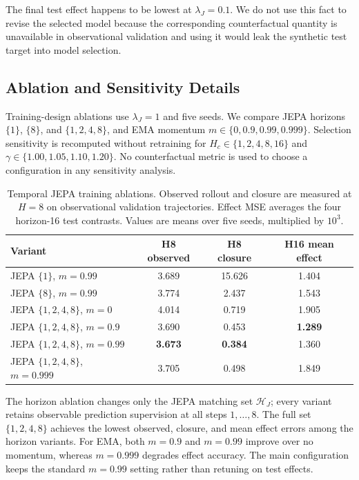 The final test effect happens to be lowest at $\lambda_J=0.1$. We do not
use this fact to revise the selected model because the corresponding
counterfactual quantity is unavailable in observational validation and
using it would leak the synthetic test target into model selection.

\subsection{Ablation and Sensitivity Details}
\label{app:ablation-details}

Training-design ablations use $\lambda_J=1$ and five seeds. We compare
JEPA horizons $\{1\}$, $\{8\}$, and $\{1,2,4,8\}$, and EMA momentum
$m\in\{0,0.9,0.99,0.999\}$. Selection sensitivity is recomputed without
retraining for $H_c\in\{1,2,4,8,16\}$ and
$\gamma\in\{1.00,1.05,1.10,1.20\}$. No counterfactual metric is used to
choose a configuration in any sensitivity analysis.

\begin{table}[t]
\centering
\caption{Temporal JEPA training ablations. Observed rollout and closure
are measured at $H=8$ on observational validation trajectories. Effect
MSE averages the four horizon-16 test contrasts. Values are means over
five seeds, multiplied by $10^3$.}
\label{tab:app-jepa-ablation}
\begin{tabular}{lccc}
\toprule
Variant & H8 observed & H8 closure & H16 mean effect \\
\midrule
JEPA $\{1\}$, $m=0.99$ & 3.689 & 15.626 & 1.404 \\
JEPA $\{8\}$, $m=0.99$ & 3.774 & 2.437 & 1.543 \\
JEPA $\{1,2,4,8\}$, $m=0$ & 4.014 & 0.719 & 1.905 \\
JEPA $\{1,2,4,8\}$, $m=0.9$ & 3.690 & 0.453 & \textbf{1.289} \\
JEPA $\{1,2,4,8\}$, $m=0.99$ & \textbf{3.673} & \textbf{0.384} & 1.360 \\
JEPA $\{1,2,4,8\}$, $m=0.999$ & 3.705 & 0.498 & 1.849 \\
\bottomrule
\end{tabular}
\end{table}

The horizon ablation changes only the JEPA matching set
$\mathcal H_J$; every variant retains observable prediction supervision
at all steps $1,\ldots,8$. The full set $\{1,2,4,8\}$ achieves the
lowest observed, closure, and mean effect errors among the horizon
variants. For EMA, both $m=0.9$ and $m=0.99$ improve over no momentum,
whereas $m=0.999$ degrades effect accuracy. The main configuration keeps
the standard $m=0.99$ setting rather than retuning on test effects.

